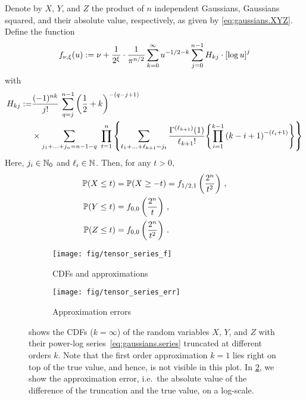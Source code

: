 \begin{theorem}%
  \label{thm:CDF_as_mejier_g}
  Denote by $X$, $Y$, and $Z$ the product of $n$ independent Gaussians, Gaussians squared, and their absolute value, respectively, as given by \cref{eq:gaussians.XYZ}.
  Define the function
  \[
    \label{eq:gaussians.series}
    f_{\nu, \xi}(u)
    :=
    \nu + \frac{1}{2^{\xi}} \cdot \frac{1}{\pi^{n/2}} \sum_{k=0}^{\infty} u^{-1/2-k} \sum_{j=0}^{n-1} H_{kj} \cdot {\left[\log u\right]}^j
  \]
  with
  \[
    \begin{split}
      H_{kj}
      :=&
      \frac{(-1)^{nk}}{j!} \, \sum_{q=j}^{n-1} {\left(\frac{1}{2}+k\right)}^{-(q-j+1)} \\
      & \times \sum_{j_1+\ldots+j_n=n-1-q} \ \prod_{t=1}^n {\left\{\sum_{\ell_1+\ldots+\ell_{k+1}=j_t} \frac{\Gamma^{(\ell_{k+1})}(1)}{\ell_{k+1}!} {\left\{\prod_{i=1}^{k-1} {\left(k-i+1\right)}^{-(\ell_i+1)}\right\}}\right\}}
    \end{split}
  \]
  Here, $j_i \in {\mathbb{N}}_0$ and $\ell_i\in {\mathbb{N}}$.
  Then, for any $t> 0$,
  \begin{align}
    \mathbb{P}{\left(X \leq t\right)}&= \mathbb{P}{\left(X \geq -t\right)} = f_{1/2,1}\left(\frac{2^n}{t^2}\right) \, , \label{eq:X_expansion}
    \\
    \mathbb{P}{\left(Y \leq t\right)} &= f_{0,0}\left(\frac{2^n}{t}\right)  \, ,\label{eq:Y_expansion}
    \\
    \mathbb{P}{\left(Z \leq t\right)} &= f_{0,0}\left(\frac{2^n}{t^2}\right) \, .\label{eq:Z_expansion}
  \end{align}
\end{theorem}


\begin{figure*}
  \begin{subfigure}{\columnwidth}
    \texttt{[image: fig/tensor\_series\_f]}
    \caption{%
      \label{fig:gaussians.cdf.f}%
      CDFs and approximations
    }
  \end{subfigure}
  \begin{subfigure}{\columnwidth}
    \texttt{[image: fig/tensor\_series\_err]}
    \caption{%
      \label{fig:gaussians.cdf.err}%
      Approximation errors
    }
  \end{subfigure}
  \caption{%
    \label{fig:gaussians.cdfs}%
     shows the CDFs ($k=\infty$) of the random variables $X$, $Y$, and $Z$ with their power-log series~\eqref{eq:gaussians.series} truncated at different orders $k$.
    Note that the first order approximation $k=1$ lies right on top of the true value, and hence, is not visible in this plot.
    In \cref{fig:gaussians.cdf.err}, we show the approximation error, i.e.\ the absolute value of the difference of the truncation and the true value, on a log-scale.
  }
\end{figure*}

